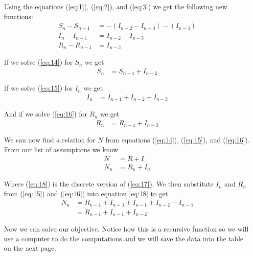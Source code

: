\documentclass[12pt]{report}
\begin{document}
Using the equations (\ref{eq:1}), (\ref{eq:2}), and (\ref{eq:3}) we get the following new functions:
\begin{align}
    S_n-S_{n-1} &= -(I_{n-2}-I_{n-3})-(I_{n-3}) \label{eq:11}\\
    I_n-I_{n-1} &= I_{n-2}-I_{n-3} \label{eq:12}\\
    R_n-R_{n-1} &= I_{n-3} \label{eq:13}
\end{align}

If we solve (\ref{eq:14}) for $S_n$ we get
\begin{align}
    S_n &= S_{n-1}+I_{n-2} \label{eq:14}
\end{align}

If we solve (\ref{eq:15}) for $I_n$ we get
\begin{align}
    I_n &= I_{n-1}+I_{n-2}-I_{n-3} \label{eq:15}
\end{align}

And if we solve (\ref{eq:16}) for $R_n$ we get
\begin{align}
    R_n &= R_{n-1}+I_{n-3} \label{eq:16}
\end{align}

We can now find a relation for $N$ from equations (\ref{eq:14}), (\ref{eq:15}), and (\ref{eq:16}). From our list of assumptions we know 
\begin{align}
    N &= R+I \label{eq:17}\\
    N_n &= R_n+I_n \label{eq:18}
\end{align}

Where (\ref{eq:18}) is the discrete version of (\ref{eq:17}). We then substitute $I_n$ and $R_n$ from (\ref{eq:15}) and (\ref{eq:16}) into equation \ref{eq:18} to get
\begin{align}
    N_n &= R_{n-1}+I_{n-3}+I_{n-1}+I_{n-2}-I_{n-3} \nonumber\\
        &= R_{n-1}+I_{n-1}+I_{n-2} \label{eq:20}
\end{align}

Now we can solve our objective. Notice how this is a recursive function so we will use a computer to do the computations and we will save the data into the table on the next page.


\end{document}

